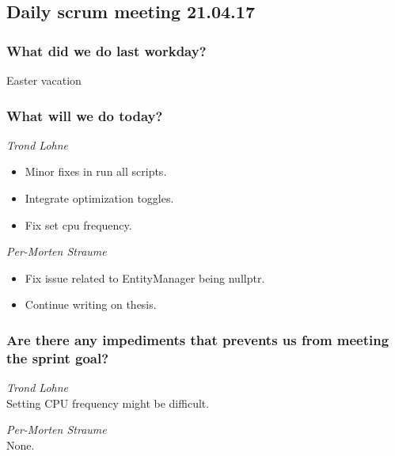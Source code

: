 \documentclass{article}
\begin{document}
\begin{center}
\subsection*{Daily scrum meeting 21.04.17}
\end{center}
\bigskip


\subsubsection*{What did we do last workday?}
Easter vacation

\subsubsection*{What will we do today?}

\noindent\textit{Trond Lohne}
\begin{itemize}
	\item
	Minor fixes in run all scripts.

	\item
	Integrate optimization toggles.

	\item
	Fix set cpu frequency.
\end{itemize}

\medskip

\noindent\textit{Per-Morten Straume}
\begin{itemize}
	\item
	Fix issue related to EntityManager being nullptr.

	\item
    Continue writing on thesis.
\end{itemize}


\subsubsection*{Are there any impediments that prevents us from meeting the sprint goal?}

\noindent\textit{Trond Lohne}\\
Setting CPU frequency might be difficult.

\medskip

\noindent\textit{Per-Morten Straume}\\
None.
\end{document}
